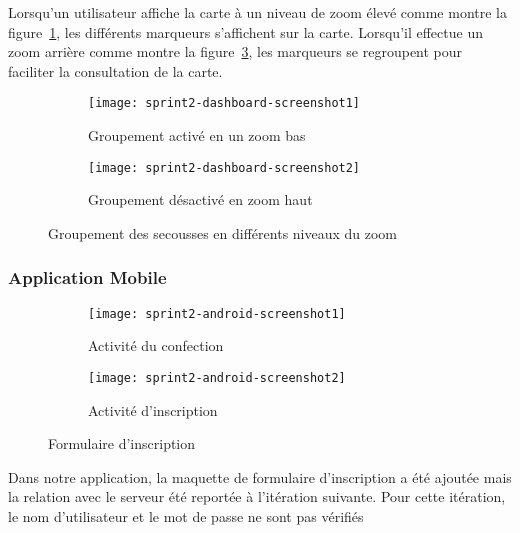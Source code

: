 Lorsqu'un utilisateur affiche la carte à un niveau de zoom élevé comme montre
la figure~\ref{fig:sprint2-dashboard-screenshot1}, les différents marqueurs
s'affichent sur la carte. Lorsqu'il effectue un zoom arrière comme montre la
figure~\ref{fig:sprint2-dashboard-screenshot2}, les marqueurs se regroupent
pour faciliter la consultation de la carte.

\begin{figure}[H]
    \begin{subfigure}{.5\textwidth}
        \centering
        \texttt{[image: sprint2-dashboard-screenshot1]}
        \caption{Groupement activé en un zoom bas}
\label{fig:sprint2-dashboard-screenshot1}
    \end{subfigure}
    \begin{subfigure}{.5\textwidth}
        \centering
        \texttt{[image: sprint2-dashboard-screenshot2]}
        \caption{Groupement désactivé en zoom haut}
\label{fig:sprint2-dashboard-screenshot2}
    \end{subfigure}
    \caption{Groupement des secousses en différents niveaux du zoom}
\end{figure}

\subsubsection{Application Mobile }

\begin{figure}[H]
\centering
    \begin{subfigure}{.45\textwidth}
        \centering
        \centering
        \texttt{[image: sprint2-android-screenshot1]}
        \caption{Activité du confection}
\label{fig:sprint2-android-screenshot1}
    \end{subfigure}
    \begin{subfigure}{.45\textwidth}
        \centering
        \centering
        \texttt{[image: sprint2-android-screenshot2]}
        \caption{Activité d'inscription}
\label{fig:sprint2-android-screenshot2}
    \end{subfigure}
    \caption{Formulaire d'inscription}
\end{figure}

Dans notre application, la maquette de formulaire d'inscription a été ajoutée
mais la relation avec le serveur été reportée à l'itération suivante. Pour
cette itération, le nom d'utilisateur et le mot de passe ne sont pas vérifiés


